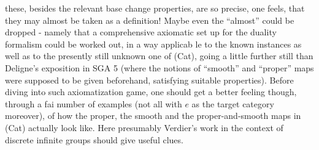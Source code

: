 
these,  besides the relevant base change properties,  are so precise,
one feels,  that they may almost be taken as a definition!  Maybe even
the ``almost'' could be dropped  -  namely that a comprehensive axiomatic
set up for the duality formalism could be worked out,  in a way applicab
le to the known instances as well as to the presently still unknown
one of (Cat),  going a little further still than Deligne's exposition
in SGA 5 (where the notions of ``smooth'' and ``proper'' maps were supposed
to be given beforehand,  satisfying suitable properties). Before diving
into such axiomatization game,  one should get a better feeling though,
through a fai number of examples (not all with $e$ as the target category
moreover),  of how the proper,  the smooth and the proper-and-smooth
maps in (Cat) actually look like.  Here presumably Verdier's work in
the context of discrete infinite groups should give useful clues.

